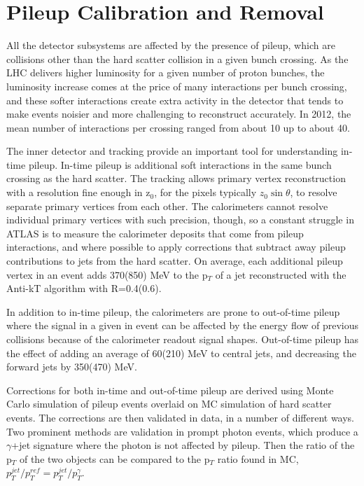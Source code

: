 
\section{Pileup Calibration and Removal}
\label{sec:pileup}
All the detector subsystems are affected by the presence of pileup, which are collisions other than the hard scatter collision in a given bunch crossing.  As the LHC delivers higher luminosity for a given number of proton bunches, the luminosity increase comes at the price of many interactions per bunch crossing, and these softer interactions create extra activity in the detector that tends to make events noisier and more challenging to reconstruct accurately.  In 2012, the mean number of interactions per crossing ranged from about 10 up to about 40.  

The inner detector and tracking provide an important tool for understanding in-time pileup.  In-time pileup is additional soft interactions in the same bunch crossing as the hard scatter.  The tracking allows primary vertex reconstruction with a resolution fine enough in z$_0$, for the pixels typically $z_0\sin\theta$, to resolve separate primary vertices from each other.   The calorimeters cannot resolve individual primary vertices with such precision, though, so a constant struggle in ATLAS is to measure the calorimeter deposits that come from pileup interactions, and where possible to apply corrections that subtract away pileup contributions to jets from the hard scatter.  On average, each additional pileup vertex in an event adds 370(850) MeV to the p$_T$ of a jet reconstructed with the Anti-kT algorithm with R=0.4(0.6).

In addition to in-time pileup, the calorimeters are prone to out-of-time pileup where the signal in a given in event can be affected by the energy flow of previous collisions because of the calorimeter readout signal shapes.  Out-of-time pileup has the effect of adding an average of 60(210) MeV to central jets, and decreasing the forward jets by 350(470) MeV.  

Corrections for both in-time and out-of-time pileup are derived using Monte Carlo simulation of pileup events overlaid on MC simulation of hard scatter events.  The corrections are then validated in data, in a number of different ways.  Two prominent methods are validation in prompt photon events, which produce a $\gamma$+jet signature where the photon is not affected by pileup.  Then the ratio of the p$_T$ of the two objects can be compared to the p$_T$ ratio found in MC, $p^{jet}_T/p^{ref}_T = p^{jet}_T/p^{\gamma}_T$.


